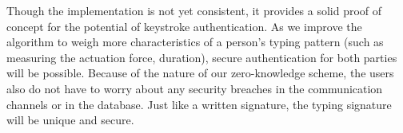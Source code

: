 \documentclass[11pt]{article}
\begin{document}
Though the implementation is not yet consistent, it provides a solid proof of concept for the potential of keystroke authentication.  As we improve the algorithm to weigh more characteristics of a person's typing pattern (such as measuring the actuation force, duration), secure authentication for both parties will be possible. Because of the nature of our zero-knowledge scheme, the users also do not have to worry about any security breaches in the communication channels or in the database. Just like a written signature, the typing signature will be unique and secure.




\end{document}
